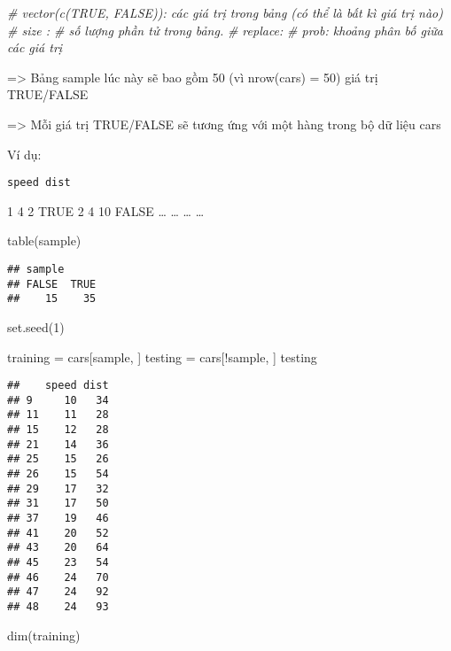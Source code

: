\documentclass[
]{article}
\newenvironment{Shaded}{\begin{snugshade}}{\end{snugshade}}
\newcommand{\CommentTok}[1]{\textcolor[rgb]{0.56,0.35,0.01}{\textit{#1}}}
\newcommand{\DecValTok}[1]{\textcolor[rgb]{0.00,0.00,0.81}{#1}}
\newcommand{\FunctionTok}[1]{\textcolor[rgb]{0.00,0.00,0.00}{#1}}
\newcommand{\NormalTok}[1]{#1}
\newcommand{\OtherTok}[1]{\textcolor[rgb]{0.56,0.35,0.01}{#1}}
\newcommand{\SpecialCharTok}[1]{\textcolor[rgb]{0.00,0.00,0.00}{#1}}
\begin{document}
\begin{Shaded}
\begin{Highlighting}[]
\CommentTok{\# vector(c(TRUE, FALSE)): các giá trị trong bảng (có thể là bất kì giá trị nào)}
\CommentTok{\# size : \# số lượng phần tử trong bảng.}
\CommentTok{\# replace: }
\CommentTok{\# prob: khoảng phân bố giữa các giá trị}
\end{Highlighting}
\end{Shaded}

=\textgreater{} Bảng sample lúc này sẽ bao gồm 50 (vì nrow(cars) = 50)
giá trị TRUE/FALSE

=\textgreater{} Mỗi giá trị TRUE/FALSE sẽ tương ứng với một hàng trong
bộ dữ liệu cars

Ví dụ:

\begin{verbatim}
speed dist 
\end{verbatim}

1 4 2 TRUE 2 4 10 FALSE \ldots{} \ldots{} \ldots{} \ldots{}

\begin{Shaded}
\begin{Highlighting}[]
\FunctionTok{table}\NormalTok{(sample)}
\end{Highlighting}
\end{Shaded}

\begin{verbatim}
## sample
## FALSE  TRUE 
##    15    35
\end{verbatim}

\begin{Shaded}
\begin{Highlighting}[]
\FunctionTok{set.seed}\NormalTok{(}\DecValTok{1}\NormalTok{)}

\NormalTok{training }\OtherTok{=}\NormalTok{ cars[sample, ]}
\NormalTok{testing }\OtherTok{=}\NormalTok{ cars[}\SpecialCharTok{!}\NormalTok{sample, ]}
\NormalTok{testing}
\end{Highlighting}
\end{Shaded}

\begin{verbatim}
##    speed dist
## 9     10   34
## 11    11   28
## 15    12   28
## 21    14   36
## 25    15   26
## 26    15   54
## 29    17   32
## 31    17   50
## 37    19   46
## 41    20   52
## 43    20   64
## 45    23   54
## 46    24   70
## 47    24   92
## 48    24   93
\end{verbatim}

\begin{Shaded}
\begin{Highlighting}[]
\FunctionTok{dim}\NormalTok{(training)}
\end{Highlighting}
\end{Shaded}
\end{document}
